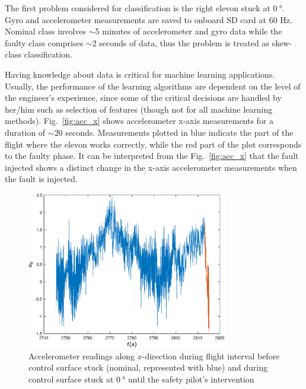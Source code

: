 The first problem considered for classification is the right elevon stuck at $\SI{0}{\degree}$.
Gyro and accelerometer measurements are saved to onboard SD card at 60 Hz. 
Nominal class involves $\sim$5 minutes of accelerometer and gyro data while the faulty class comprises $\sim$2 seconds of data, thus the problem is treated as skew-class classification. 

Having knowledge about data is critical for machine learning applications. 
Usually, the performance of the learning algorithms are dependent on the level of the engineer's experience, since some of the critical decisions are handled by her/him such as selection of features (though not for all machine learning methods).
Fig.~\ref{fig:acc_x} shows accelerometer x-axis measurements for a duration of $\sim$20 seconds. 
Measurements plotted in blue indicate the part of the flight where the elevon works correctly, while the red part of the plot corresponds to the faulty phase. 
It can be interpreted from the Fig.~\ref{fig:acc_x} that the fault injected shows a distinct change in the x-axis accelerometer measurements when the fault is injected. 

\begin{figure}[H]
\begin{center}
\includegraphics[width=0.78\textwidth]{figures/acc_x_evenLongerNominal}    %
\caption{Accelerometer readings along $x$-direction during flight interval before control surface stuck (nominal, represented with blue) and during control surface stuck at  $\SI{0}{\degree}$ until the safety pilot's intervention} 
\label{fig:acc_x_evenLongerNominal}
\end{center}
\end{figure}



